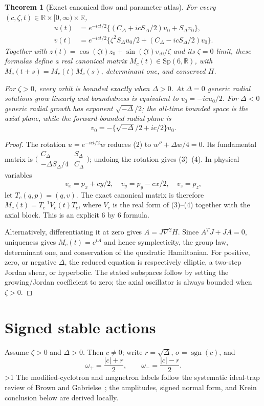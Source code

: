 \documentclass[10pt]{article}
\providecommand{\CRevisionRound}{2}
\newtheorem{theorem}{Theorem}
\begin{document}
\begin{theorem}[Exact canonical flow and parameter atlas]
For every $(c,\zeta,t)\in\mathbb R\times[0,\infty)\times\mathbb R$,
\begin{align}
u(t)&=e^{-ict/2}\{(C_\Delta+icS_\Delta/2)u_0+S_\Delta v_0\},\tag{3}\\
v(t)&=e^{-ict/2}\{\zeta^2S_\Delta u_0/2+(C_\Delta-icS_\Delta/2)v_0\}.\tag{4}
\end{align}
Together with
$z(t)=\cos(\zeta t)z_0+\sin(\zeta t)v_{z0}/\zeta$ and its $\zeta=0$ limit,
these formulas define a real canonical matrix $M_c(t)\in\mathrm{Sp}(6,\mathbb
R)$, with $M_c(t+s)=M_c(t)M_c(s)$, determinant one, and conserved $H$.

For $\zeta>0$, every orbit is bounded exactly when $\Delta>0$.  At
$\Delta=0$ generic radial solutions grow linearly and boundedness is equivalent
to $v_0=-icu_0/2$.  For $\Delta<0$ generic radial growth has exponent
$\sqrt{-\Delta}/2$; the all-time bounded space is the axial plane, while the
forward-bounded radial plane is
\[
 v_0=-\{\sqrt{-\Delta}/2+ic/2\}u_0.
\]
\end{theorem}

\begin{proof}
The rotation $u=e^{-ict/2}w$ reduces (2) to
$w''+\Delta w/4=0$.  Its fundamental matrix is
$\bigl(\begin{smallmatrix}C_\Delta&S_\Delta\\
-\Delta S_\Delta/4&C_\Delta\end{smallmatrix}\bigr)$; undoing the rotation
gives (3)--(4).  In physical variables
\[
 v_x=p_x+cy/2,\quad v_y=p_y-cx/2,\quad v_z=p_z,
\]
let $T_c(q,p)=(q,v)$.  The exact canonical matrix is therefore
$M_c(t)=T_c^{-1}V_c(t)T_c$, where $V_c$ is the real form of (3)--(4) together
with the axial block.  This is an explicit $6$ by $6$ formula.

Alternatively, differentiating it at zero gives $A=J\nabla^2H$.  Since
$A^{T}J+JA=0$, uniqueness gives $M_c(t)=e^{tA}$ and hence symplecticity,
the group law, determinant one, and conservation of the quadratic Hamiltonian.
For positive, zero, or negative $\Delta$, the reduced equation is respectively
elliptic, a two-step Jordan shear, or hyperbolic.  The stated subspaces follow
by setting the growing/Jordan coefficient to zero; the axial oscillator is
always bounded when $\zeta>0$.
\end{proof}

\section{Signed stable actions}
Assume $\zeta>0$ and $\Delta>0$.  Then $c\ne0$; write
$r=\sqrt\Delta$, $\sigma=\operatorname{sgn}(c)$, and
\[
 \omega_+=\frac{|c|+r}{2},\qquad \omega_-=\frac{|c|-r}{2}.
\]
\ifnum\CRevisionRound>1
The modified-cyclotron and magnetron labels follow the systematic ideal-trap
review of Brown and Gabrielse~\cite{BrownGabrielse1986}; the amplitudes, signed
normal form, and Krein conclusion below are derived locally.
\fi
\end{document}
